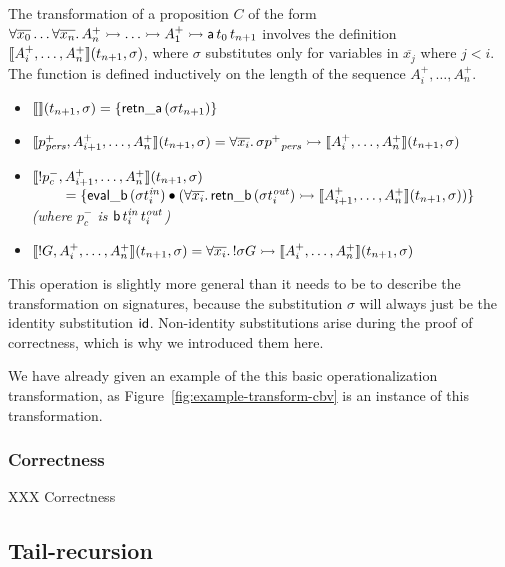 The transformation of a proposition $C$ of the form $\forall
\overline{x_0}\ldots \forall \overline{x_n}.\,A^+_n \rightarrowtail \ldots
\rightarrowtail A^+_1 \rightarrowtail {\sf a}\,t_{0}\,t_{n+1}$ involves the definition
$\llbracket {A^+_i,\ldots,A^+_n} \rrbracket({t_{n+1}},{\sigma})$, where $\sigma$
substitutes only for variables in $\overline{x_j}$ where $j < i$. The
function is defined inductively on the length of the sequence
$A^+_i,\ldots,A^+_n$.

\begin{itemize}
\item $\llbracket {} \rrbracket({t_{n+1}},{\sigma}) = \{ {\sf retn\_a}\,(\sigma{t_{n+1}}) \}$
\item $\llbracket {p^+_{\it pers},A^+_{i+1},\ldots,A^+_n} \rrbracket({t_{n+1}},{\sigma}) 
  = \forall \overline{x_i}.\, \sigma{p^+}_{\it pers} \rightarrowtail \llbracket {A^+_i,\ldots,A^+_n} \rrbracket({t_{n+1}},{\sigma})$
\item $\llbracket {{!}p^-_c,A^+_{i+1},\ldots,A^+_n} \rrbracket({t_{n+1}},{\sigma})$
  \\
  $~ \qquad = \{ {\sf eval\_b}\,({\sigma}t^{\it in}_i) \mathbin{\bullet}
  (\forall\overline{x_i}.\, {\sf retn\_b}\,(\sigma{t^{\it out}_i})
  \rightarrowtail \llbracket {A^+_{i+1},\ldots,A^+_n} \rrbracket({t_{n+1}},{\sigma})) \}$\\
  {\it (where $p^-_c$ is ${\sf b}\,t^{\it in}_i\,t^{\it out}_i$)}
\item $\llbracket {{!}G,A^+_i,\ldots,A^+_n} \rrbracket({t_{n+1}},{\sigma})
  = \forall \overline{x_i}.\, {!}\sigma{G} \rightarrowtail \llbracket {A^+_i,\ldots,A^+_n} \rrbracket({t_{n+1}},{\sigma})$
\end{itemize}

\noindent
This operation is slightly more general than it needs to be to
describe the transformation on signatures, because the substitution
$\sigma$ will always just be the identity substitution ${\sf id}$.
Non-identity substitutions arise during the proof of correctness, which
is why we introduced them here.

We have already given an example of the this basic operationalization
transformation, as Figure~\ref{fig:example-transform-cbv} is an
instance of this transformation.

\subsubsection{Correctness}

XXX Correctness

\subsection{Tail-recursion}
\label{sec:trans-tail}

